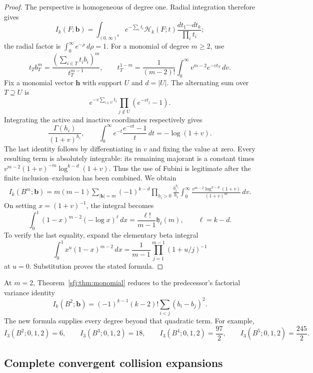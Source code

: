\begin{proof}
The perspective is homogeneous of degree one.  Radial integration
therefore gives
\[
 I_k(F;\boldsymbol b)=
 \int_{(0,\infty)^k} e^{-\sum_i t_i}
            \mathcal H_k(F;t)\frac{dt_1\cdots dt_k}{\prod_i t_i};
\]
the radial factor is $\int_0^\infty e^{-\rho}\,d\rho=1$.
For a monomial of degree $m\ge2$, use
\[
 t_T b_T^m=\frac{(\sum_{i\in T}t_i b_i)^m}{t_T^{m-1}},\qquad
 t_T^{1-m}=\frac1{(m-2)!}\int_0^\infty
                      v^{m-2}e^{-vt_T}\,dv.
\]
Fix a monomial vector $\boldsymbol h$ with support $U$ and $d=|U|$.
The alternating sum over $T\supseteq U$ is
\[
 e^{-v\sum_{i\in U}t_i}
             \prod_{j\notin U}(e^{-vt_j}-1).
\]
Integrating the active and inactive coordinates respectively gives
\[
 \frac{\Gamma(h_i)}{(1+v)^{h_i}},\qquad
 \int_0^\infty e^{-t}\frac{e^{-vt}-1}{t}\,dt=-\log(1+v).
\]
The last identity follows by differentiating in $v$ and fixing the
value at zero.  Every resulting term is absolutely integrable: its
remaining majorant is a constant times
$v^{m-2}(1+v)^{-m}\log^{k-d}(1+v)$.  Thus the use of Fubini is
legitimate after the finite inclusion--exclusion has been combined.
We obtain
\begin{align*}
 I_k(B^m;\boldsymbol b)
  =m(m-1)\sum_{|\boldsymbol h|=m}
     (-1)^{k-d}\prod_{h_i>0}\frac{b_i^{h_i}}{h_i}
       \int_0^\infty
        \frac{v^{m-2}\log^{k-d}(1+v)}{(1+v)^m}\,dv.
\end{align*}
On setting $x=(1+v)^{-1}$, the integral becomes
\[
 \int_0^1(1-x)^{m-2}(-\log x)^{\ell}\,dx
       =\frac{\ell!}{m-1}\mathfrak h_\ell(m),\qquad \ell=k-d.
\]
To verify the last equality, expand the elementary beta integral
\[
 \int_0^1x^u(1-x)^{m-2}\,dx
 =\frac1{m-1}\prod_{j=1}^{m-1}(1+u/j)^{-1}
\]
at $u=0$.  Substitution proves the stated formula.
\end{proof}

At $m=2$, Theorem~\ref{sfj:thm:monomial} reduces to the predecessor's
factorial variance identity
\begin{equation}\label{sfj:eq:quadratic}
 I_k(B^2;\boldsymbol b)
   =(-1)^{k-1}(k-2)!\sum_{i<j}(b_i-b_j)^2.
\end{equation}
The new formula supplies every degree beyond that quadratic term.  For
example,
\begin{equation}\label{sfj:eq:three-polynomials}
 I_3(B^2;0,1,2)=6,\qquad I_3(B^3;0,1,2)=18,\qquad
 I_3(B^4;0,1,2)=\frac{97}{2},\qquad
 I_3(B^5;0,1,2)=\frac{245}{2}.
\end{equation}

\subsection{Complete convergent collision expansions}


